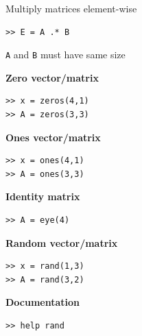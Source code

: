 \documentclass[11pt,xcolor=svgnames,onlymath]{beamer}
\begin{document}
\begin{frame}
Multiply matrices element-wise
\begin{lstlisting}
>> E = A .* B
\end{lstlisting}
{\tt A} and {\tt B} must have same size

{\bf Zero vector/matrix}
\begin{lstlisting}
>> x = zeros(4,1)
>> A = zeros(3,3)
\end{lstlisting}

{\bf Ones vector/matrix}
\begin{lstlisting}
>> x = ones(4,1)
>> A = ones(3,3)
\end{lstlisting}

{\bf Identity matrix}
\begin{lstlisting}
>> A = eye(4)
\end{lstlisting}

{\bf Random vector/matrix}
\begin{lstlisting}
>> x = rand(1,3)
>> A = rand(3,2)
\end{lstlisting}

{\bf Documentation}
\begin{lstlisting}
>> help rand
\end{lstlisting}

\end{frame}
\end{document}
